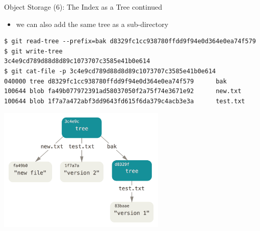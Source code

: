 \begin{frame}[fragile]{Object Storage (6): The Index as a Tree continued}

  \begin{itemize}
    \item we can also add the same tree as a sub-directory
  \end{itemize}

\begin{lstlisting}[style=ShellCmd]
$ git read-tree --prefix=bak d8329fc1cc938780ffdd9f94e0d364e0ea74f579
$ git write-tree
3c4e9cd789d88d8d89c1073707c3585e41b0e614
$ git cat-file -p 3c4e9cd789d88d8d89c1073707c3585e41b0e614
040000 tree d8329fc1cc938780ffdd9f94e0d364e0ea74f579      bak
100644 blob fa49b077972391ad58037050f2a75f74e3671e92      new.txt
100644 blob 1f7a7a472abf3dd9643fd615f6da379c4acb3e3a      test.txt
\end{lstlisting}

\includegraphics[width=0.60\textwidth]{imgs/index_tree}
\end{frame}

